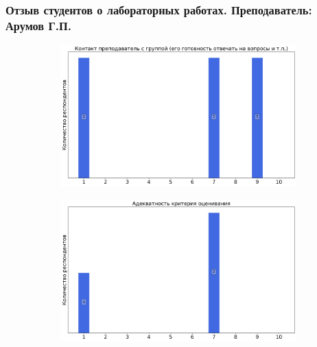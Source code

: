     \subsubsection{Отзыв студентов о лабораторных работах. Преподаватель: Арумов Г.П.}
		\begin{figure}[H]
			\centering
			\begin{subfigure}[b]{0.45\textwidth}
				\centering
				\includegraphics[width=\textwidth]{images/2 course/Радиотехнические цепи и сигналы/labniks-marks-Арумов Г.П.-0.png}
			\end{subfigure}
			\begin{subfigure}[b]{0.45\textwidth}
				\centering
				\includegraphics[width=\textwidth]{images/2 course/Радиотехнические цепи и сигналы/labniks-marks-Арумов Г.П.-1.png}
			\end{subfigure}
			\begin{subfigure}[b]{0.45\textwidth}
				\centering

\end{subfigure}
\end{figure}
